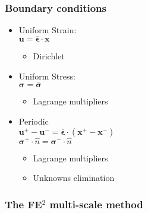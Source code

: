 \documentclass[usenames,dvipsnames]{beamer}
\begin{document}

\begin{frame}
\frametitle{Boundary conditions}

\begin{minipage}[h]{0.49\linewidth}
\begin{itemize}
\item Uniform Strain: \\ $\bm{u} = \overline{\bm{\epsilon}} \cdot \bm{x} $
  \begin{itemize}
  \item Dirichlet
  \end{itemize}
  \vspace{0.5cm}
\item Uniform Stress: \\$ \bm{\sigma} = \overline{\bm{\sigma}} $
  \begin{itemize}
  \item Lagrange multipliers
  \end{itemize}
  \vspace{0.5cm}
\item Periodic \\
$ \bm{u}^+ - \bm{u}^- = \overline{\bm{\epsilon}} \cdot (\bm{x}^+ - \bm{x}^-) $\\
$ \bm{\sigma}^+ \cdot \hat{n}  = \bm{\sigma}^- \cdot \hat{n}$
  \begin{itemize}
  \item Lagrange multipliers
  \item Unknowns elimination
  \end{itemize}
\end{itemize}
\end{minipage}
\begin{minipage}[h]{0.49\linewidth}
\resizebox{0.8\linewidth}{!}{}
\end{minipage}

\end{frame}


\begin{frame}
\frametitle{The FE$^2$ multi-scale method}

\begin{figure}[!ht]
\resizebox{1.0\linewidth}{!}{}
\end{figure}
\end{frame}

\end{document}
